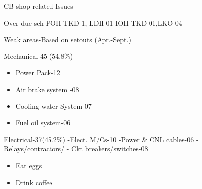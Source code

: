 \documentclass[
  ignorenonframetext,
]{beamer}
\providecommand{\tightlist}{%
  \setlength{\itemsep}{0pt}\setlength{\parskip}{0pt}}
\begin{document}
\begin{frame}{CB shop related Issues}
\protect\hypertarget{cb-shop-related-issues}{}
\begin{block}{Over due sch}
\protect\hypertarget{over-due-sch}{}
POH-TKD-1, LDH-01 IOH-TKD-01,LKO-04
\end{block}

\begin{block}{Weak areas-Based on setouts (Apr.-Sept.)}
\protect\hypertarget{weak-areas-based-on-setouts-apr.-sept.}{}

\begin{block}{Mechanical-45 (54.8\%)}
\protect\hypertarget{mechanical-45-54.8}{}
\begin{itemize}[<+->]
\tightlist
\item
  Power Pack-12
\item
  Air brake system -08
\item
  Cooling water System-07
\item
  Fuel oil system-06
\end{itemize}
\end{block}

\begin{block}{Electrical-37(45.2\%)}
\protect\hypertarget{electrical-3745.2}{}
-Elect. M/Cs-10 -Power \& CNL cables-06 - Relays/contractors/ - Ckt
breakers/switches-08

\begin{itemize}
\tightlist
\item
  Eat eggs
\item
  Drink coffee
\end{itemize}
\end{block}
\end{block}
\end{frame}
\end{document}
